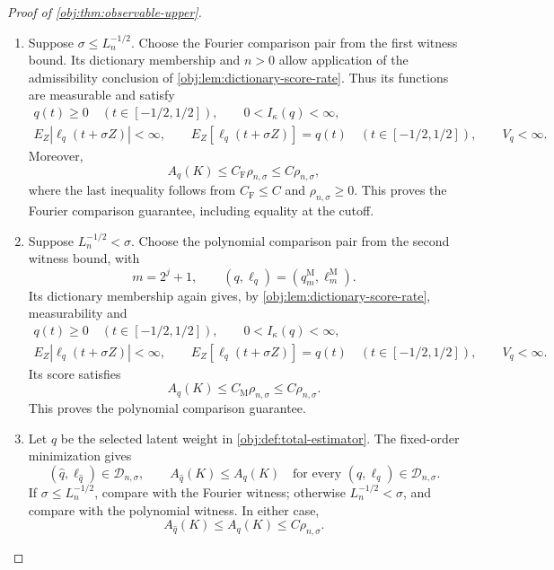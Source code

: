 \begin{proof}[Proof of \cref{obj:thm:observable-upper}]
\begin{enumerate}
\item Suppose \(\sigma\le L_n^{-1/2}\). Choose the Fourier comparison pair from the first witness bound. Its dictionary membership and \(n>0\) allow application of the admissibility conclusion of \cref{obj:lem:dictionary-score-rate}. Thus its functions are measurable and satisfy
\[
\begin{gathered}
q(t)\ge0\quad(t\in[-1/2,1/2]),
\qquad 0<I_\kappa(q)<\infty,\\
E_Z|\ell_q(t+\sigma Z)|<\infty,
\qquad E_Z[\ell_q(t+\sigma Z)]=q(t)
\quad(t\in[-1/2,1/2]),
\qquad V_q<\infty.
\end{gathered}
\]
Moreover,
\[
A_q(K)\le C_{\mathrm F}\rho_{n,\sigma}
\le C\rho_{n,\sigma},
\]
where the last inequality follows from \(C_{\mathrm F}\le C\) and \(\rho_{n,\sigma}\ge0\). This proves the Fourier comparison guarantee, including equality at the cutoff. %

\item Suppose \(L_n^{-1/2}<\sigma\). Choose the polynomial comparison pair from the second witness bound, with
\[
m=2^j+1,
\qquad
(q,\ell_q)=(q_m^{\mathrm M},\ell_m^{\mathrm M}).
\]
Its dictionary membership again gives, by \cref{obj:lem:dictionary-score-rate}, measurability and
\[
\begin{gathered}
q(t)\ge0\quad(t\in[-1/2,1/2]),
\qquad 0<I_\kappa(q)<\infty,\\
E_Z|\ell_q(t+\sigma Z)|<\infty,
\qquad E_Z[\ell_q(t+\sigma Z)]=q(t)
\quad(t\in[-1/2,1/2]),
\qquad V_q<\infty.
\end{gathered}
\]
Its score satisfies
\[
A_q(K)\le C_{\mathrm M}\rho_{n,\sigma}
\le C\rho_{n,\sigma}.
\]
This proves the polynomial comparison guarantee. %

\item Let \(\widehat q\) be the selected latent weight in \cref{obj:def:total-estimator}. The fixed-order minimization gives
\[
(\widehat q,\ell_{\widehat q})\in\mathcal D_{n,\sigma},
\qquad
A_{\widehat q}(K)\le A_q(K)
\quad\text{for every }(q,\ell_q)\in\mathcal D_{n,\sigma}.
\]
If \(\sigma\le L_n^{-1/2}\), compare with the Fourier witness; otherwise \(L_n^{-1/2}<\sigma\), and compare with the polynomial witness. In either case,
\[
A_{\widehat q}(K)\le A_q(K)\le C\rho_{n,\sigma}.
\]


\end{enumerate}
\end{proof}
